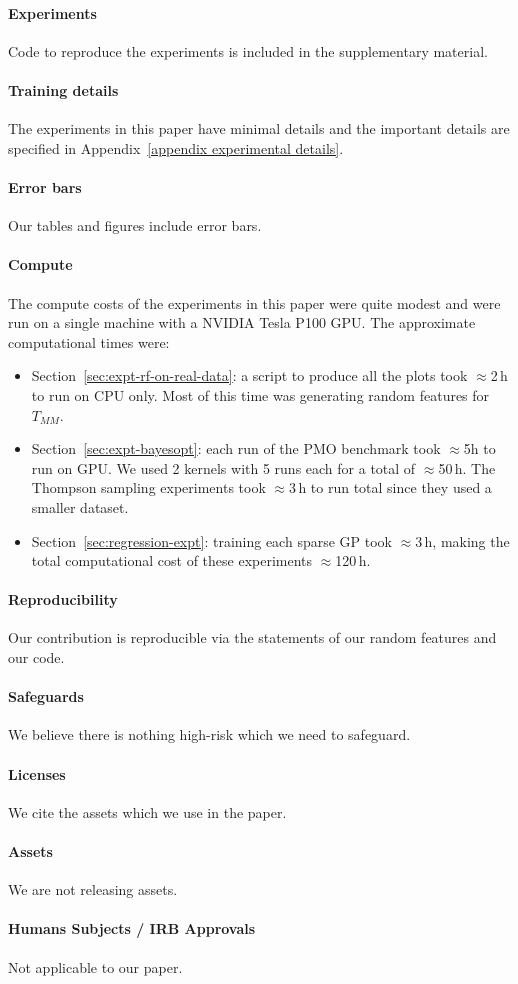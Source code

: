 \documentclass{article}
\theoremstyle{plain}
\theoremstyle{definition}
\theoremstyle{remark}
\begin{document}
\paragraph{Experiments}
Code to reproduce the experiments is included in the supplementary material.

\paragraph{Training details}
The experiments in this paper have minimal details and the important details are specified in Appendix~\ref{appendix experimental details}.

\paragraph{Error bars} Our tables and figures include error bars.

\paragraph{Compute}
The compute costs of the experiments in this paper were quite modest
and were run on a single machine with a NVIDIA Tesla P100 GPU.
The approximate computational times were:
\begin{itemize}
    \item Section~\ref{sec:expt-rf-on-real-data}: a script to produce all the plots took $\approx$2\,h to run on CPU only. Most of this time was generating random features for $T_{MM}$.
    \item Section~\ref{sec:expt-bayesopt}: each run of the PMO benchmark took $\approx$5h to run on GPU. We used 2 kernels with 5 runs each for a total of $\approx$50\,h.
    The Thompson sampling experiments took $\approx$3\,h to run total since they used a smaller dataset.
    \item Section~\ref{sec:regression-expt}: training each sparse GP took $\approx$3\,h,
    making the total computational cost of these experiments $\approx$120\,h.
\end{itemize}

\paragraph{Reproducibility}
Our contribution is reproducible via the statements of our random features
and our code.

\paragraph{Safeguards}
We believe there is nothing high-risk which we need to safeguard.

\paragraph{Licenses}
We cite the assets which we use in the paper.

\paragraph{Assets}
We are not releasing assets.

\paragraph{Humans Subjects / IRB Approvals}
Not applicable to our paper.
\end{document}
